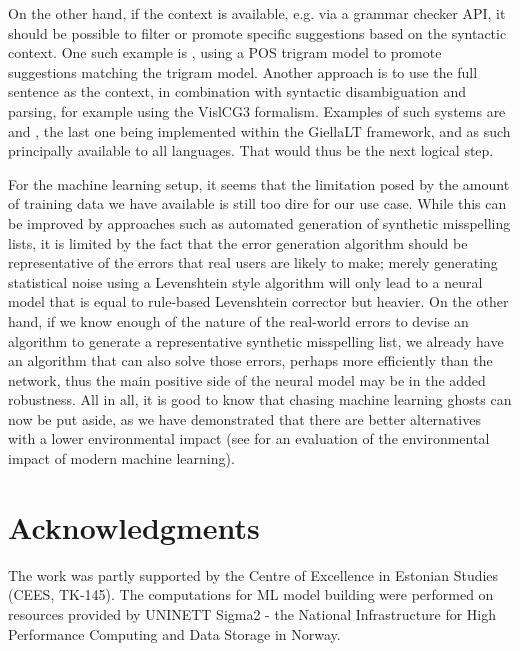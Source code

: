 \documentclass{flammie}
\begin{document}
On the other hand, if the context is available, e.g. via a grammar checker API,
it should be possible to filter or promote specific suggestions based on the
syntactic context. One such example is \cite{pirinent_et_al_2012}, using a POS
trigram model to promote suggestions matching the trigram model. Another
approach is to use the full sentence as the context, in combination with
syntactic disambiguation and parsing, for example using the VislCG3 formalism.
Examples of such systems are \cite{Bick2006ACG} and
\cite{wiechetek-etal-2019-seeing}, the last one being implemented within the
GiellaLT framework, and as such principally available to all languages. That
would thus be the next logical step.

For the machine learning setup, it seems that the limitation posed by the amount
of training data we have available is still too dire for our use case. While
this can be improved by approaches such as automated generation of synthetic
misspelling lists, it is limited by the fact that the error generation algorithm
should be representative of the errors that real users are likely to make;
merely generating statistical noise using a Levenshtein style algorithm will
only lead to a neural model that is equal to rule-based Levenshtein corrector
but heavier. On the other hand, if we know enough of  the nature of the
real-world errors to devise an algorithm to generate a representative synthetic
misspelling list, we already have an algorithm that can also solve those errors,
perhaps more efficiently than the network, thus the main positive side of the
neural model may be in the added robustness.  All in all, it is good to know
that chasing machine learning ghosts can now be put aside, as we have
demonstrated that there are better alternatives with a lower environmental
impact (see \cite{strubell2019energy} for an evaluation of the environmental
impact of modern machine learning).


\clearpage

\section*{Acknowledgments}

The work was partly supported by the Centre of Excellence in Estonian Studies
(CEES, TK-145).  The computations for ML model building were performed on
resources provided by UNINETT Sigma2 - the National Infrastructure for High
Performance Computing and Data Storage in Norway.


\end{document}
